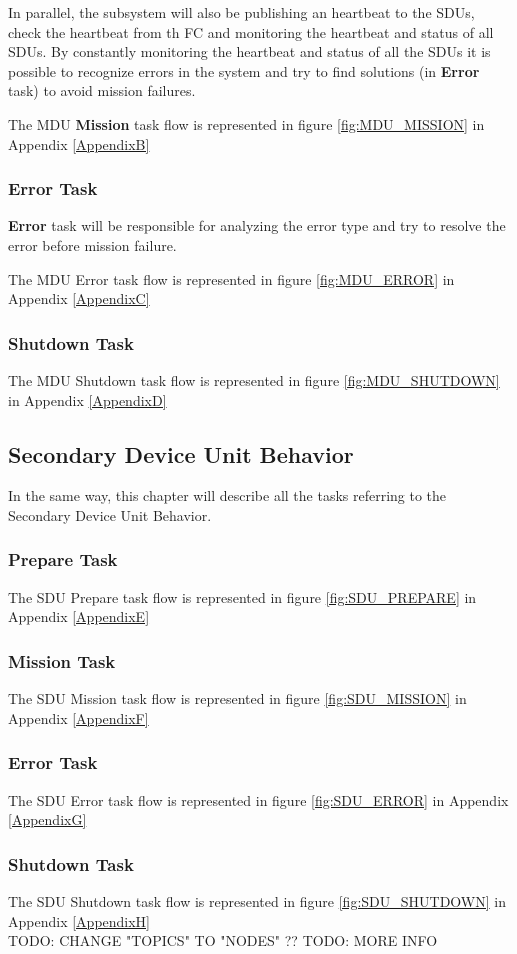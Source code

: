 In parallel, the subsystem will also be publishing an heartbeat to the SDUs, check the heartbeat from th FC and monitoring the heartbeat and status of all SDUs.
By constantly monitoring the heartbeat and status of all the SDUs it is possible to recognize errors in the system and try to find solutions (in \textbf{Error} task) to avoid mission failures.

The MDU \textbf{Mission} task flow is represented in figure \ref{fig:MDU_MISSION} in Appendix \ref{AppendixB}\\

\subsubsection{Error Task}
\textbf{Error} task will be responsible for analyzing the error type and try to resolve the error before mission failure.

The MDU Error task flow is represented in figure \ref{fig:MDU_ERROR} in Appendix \ref{AppendixC}\\

\subsubsection{Shutdown Task}
The MDU Shutdown task flow is represented in figure \ref{fig:MDU_SHUTDOWN} in Appendix \ref{AppendixD}\\

\subsection{Secondary Device Unit Behavior}
In the same way, this chapter will describe all the tasks referring to the Secondary Device Unit Behavior.

\subsubsection{Prepare Task}
The SDU Prepare task flow is represented in figure \ref{fig:SDU_PREPARE} in Appendix \ref{AppendixE}\\

\subsubsection{Mission Task}
The SDU Mission task flow is represented in figure \ref{fig:SDU_MISSION} in Appendix \ref{AppendixF}\\

\subsubsection{Error Task}
The SDU Error task flow is represented in figure \ref{fig:SDU_ERROR} in Appendix \ref{AppendixG}\\

\subsubsection{Shutdown Task}
The SDU Shutdown task flow is represented in figure \ref{fig:SDU_SHUTDOWN} in Appendix \ref{AppendixH}\\

TODO: CHANGE "TOPICS" TO "NODES" ??
TODO: MORE INFO
